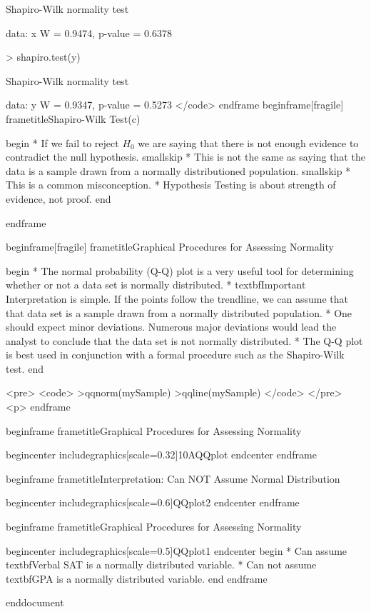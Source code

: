         Shapiro-Wilk normality test

data:  x
W = 0.9474, p-value = 0.6378

> shapiro.test(y)

        Shapiro-Wilk normality test

data:  y
W = 0.9347, p-value = 0.5273
</code>
end{frame}
begin{frame}[fragile]
	frametitle{Shapiro-Wilk Test(c)}
	
begin{ }
	 *           If we fail to reject $H_0$ we are saying that there is not enough evidence to contradict the null hypothesis. smallskip
	 *           This is not the same as saying that the data is a sample drawn from a normally distributioned population. smallskip
	 *           This is a common misconception.
	 *           Hypothesis Testing is about strength of evidence, not proof.
end{ }
	
	
end{frame}


begin{frame}[fragile]
frametitle{Graphical Procedures for Assessing Normality}

begin{ }
 *           The normal probability (Q-Q) plot is a very useful tool for determining whether or not a data set is normally distributed.
 *           textbf{Important} Interpretation is simple. If the points follow the trendline, we can assume that that data set is a sample drawn from a normally distributed population.
 *           One should expect minor deviations. Numerous major deviations would lead the analyst to conclude that the data set is not normally distributed.
 *           The Q-Q plot is best used in conjunction with a formal procedure such as the Shapiro-Wilk test.
end{ }

<pre>
<code>
>qqnorm(mySample)
>qqline(mySample)
</code>
</pre>
<p>
end{frame}


begin{frame}
frametitle{Graphical Procedures for Assessing Normality}

begin{center}
includegraphics[scale=0.32]{10AQQplot}
end{center}
end{frame}


begin{frame}
	frametitle{Interpretation: Can NOT Assume Normal Distribution}
	
	begin{center}
		includegraphics[scale=0.6]{QQplot2}
	end{center}
end{frame}


begin{frame}
	frametitle{Graphical Procedures for Assessing Normality}
	
	begin{center}
		includegraphics[scale=0.5]{QQplot1}
	end{center}
begin{ }
	 *           Can assume textbf{Verbal SAT} is a normally distributed variable.
	 *           Can not assume textbf{GPA} is a normally distributed variable.
end{ }
end{frame}

end{document}
